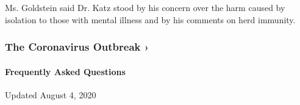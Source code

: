 Ms. Goldstein said Dr. Katz stood by his concern over the harm caused by
isolation to those with mental illness and by his comments on herd
immunity.

\href{https://www.nytimes.com/news-event/coronavirus?action=click\&pgtype=Article\&state=default\&region=MAIN_CONTENT_3\&context=storylines_faq}{}

\hypertarget{the-coronavirus-outbreak-}{%
\subsubsection{The Coronavirus Outbreak
›}\label{the-coronavirus-outbreak-}}

\hypertarget{frequently-asked-questions}{%
\paragraph{Frequently Asked
Questions}\label{frequently-asked-questions}}

Updated August 4, 2020

